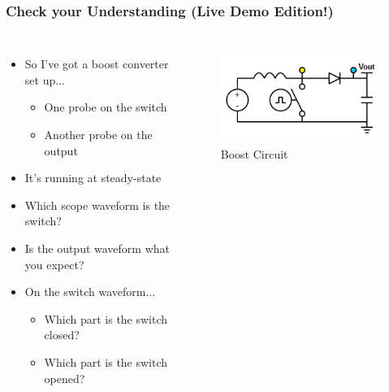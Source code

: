 \documentclass{beamer}
\begin{document}
\begin{frame}
\frametitle{Check your Understanding {\small (Live Demo Edition!)}}
\begin{columns}[t]
\begin{itemize}
  \item So I've got a boost converter set up...
  \begin{itemize}
    \item One probe on the switch
    \item Another probe on the output
  \end{itemize}
  \item It's running at steady-state
  \item<2-> Which scope waveform is the switch?
  \item<3-> Is the output waveform what you expect?
  \item<4-> On the switch waveform...
  \begin{itemize}
    \item<4-> Which part is the switch closed? 
    \item<5-> Which part is the switch opened?
  \end{itemize}
\end{itemize}

\begin{figure}
  \centering
  \includegraphics[scale=0.33]{images-dis4/smps-boost-probed} \\
  Boost Circuit
\end{figure}
\end{columns}
\end{frame}
\end{document}
